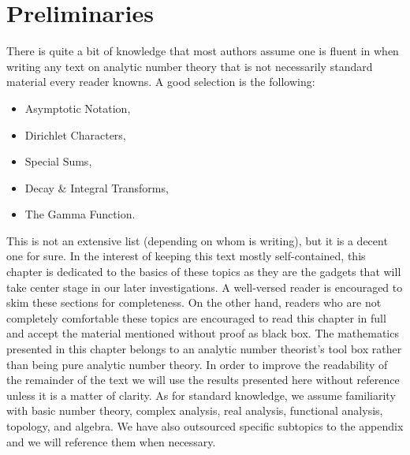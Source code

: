   \chapter{Preliminaries}\label{ch:Preliminaries}
    There is quite a bit of knowledge that most authors assume one is fluent in when writing any text on analytic number theory that is not necessarily standard material every reader knowns. A good selection is the following:
    \begin{itemize}
      \item Asymptotic Notation,
      \item Dirichlet Characters,
      \item Special Sums,
      \item Decay \& Integral Transforms,
      \item The Gamma Function.
    \end{itemize}
    This is not an extensive list (depending on whom is writing), but it is a decent one for sure. In the interest of keeping this text mostly self-contained, this chapter is dedicated to the basics of these topics as they are the gadgets that will take center stage in our later investigations. A well-versed reader is encouraged to skim these sections for completeness. On the other hand, readers who are not completely comfortable these topics are encouraged to read this chapter in full and accept the material mentioned without proof as black box. The mathematics presented in this chapter belongs to an analytic number theorist's tool box rather than being pure analytic number theory. In order to improve the readability of the remainder of the text we will use the results presented here without reference unless it is a matter of clarity. As for standard knowledge, we assume familiarity with basic number theory, complex analysis, real analysis, functional analysis, topology, and algebra. We have also outsourced specific subtopics to the appendix and we will reference them when necessary.
